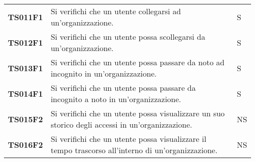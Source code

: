 \documentclass[../../piano-di-qualifica.tex]{subfiles}
\begin{document}
\begin{longtable}[H]{>{\centering\bfseries}m{3cm} >{}m{10cm} >{\centering\arraybackslash}m{3cm}}
  TS011F1            & Si verifichi che un utente collegarsi ad un'organizzazione.
                     & S                                                                                                                                                                                                                                                   \\

  TS012F1            & Si verifichi che un utente possa scollegarsi da un'organizzazione.
                     & S                                                                                                                                                                                                                                                   \\

  TS013F1            & Si verifichi che un utente possa passare da noto ad incognito in un'organizzazione.
                     & S                                                                                                                                                                                                                                                   \\

  TS014F1            & Si verifichi che un utente possa passare da incognito a noto in un'organizzazione.
                     & S                                                                                                                                                                                                                                                   \\

  TS015F2            & Si verifichi che un utente possa visualizzare un suo storico degli accessi in un'organizzazione.
                     & NS                                                                                                                                                                                                                                                  \\

  TS016F2            & Si verifichi che un utente possa visualizzare il tempo trascorso all'interno di un'organizzazione.
                     & NS                                                                                                                                                                                                                                                  \\


\end{longtable}
\end{document}
